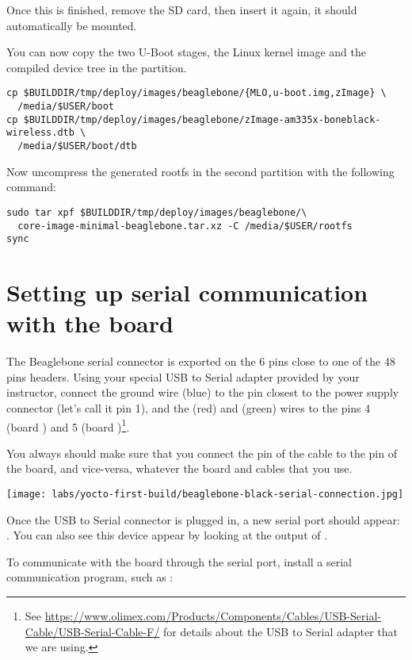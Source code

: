 Once this is finished, remove the SD card, then insert it again, it
should automatically be mounted.

You can now copy the two U-Boot stages, the Linux kernel image and the compiled
device tree in the  partition.
\begin{verbatim}
cp $BUILDDIR/tmp/deploy/images/beaglebone/{MLO,u-boot.img,zImage} \
  /media/$USER/boot
cp $BUILDDIR/tmp/deploy/images/beaglebone/zImage-am335x-boneblack-wireless.dtb \
  /media/$USER/boot/dtb
\end{verbatim}

Now uncompress the generated rootfs in the second partition with the
following  command:
\begin{verbatim}
sudo tar xpf $BUILDDIR/tmp/deploy/images/beaglebone/\
  core-image-minimal-beaglebone.tar.xz -C /media/$USER/rootfs
sync
\end{verbatim}

\section{Setting up serial communication with the board}

The Beaglebone serial connector is exported on the 6 pins close to one
of the 48 pins headers. Using your special USB to Serial adapter provided
by your instructor, connect the ground wire (blue) to the pin closest
to the power supply connector (let's call it pin 1), and the \code{TX} (red)
and \code{RX} (green) wires to the pins 4 (board \code{RX}) and
5 (board \code{TX})\footnote{See
\url{https://www.olimex.com/Products/Components/Cables/USB-Serial-Cable/USB-Serial-Cable-F/}
for details about the USB to Serial adapter that we are using.}.

You always should make sure that you connect the \code{TX} pin of the cable
to the \code{RX} pin of the board, and vice-versa, whatever the board and
cables that you use.

\begin{center}
\texttt{[image: labs/yocto-first-build/beaglebone-black-serial-connection.jpg]}
\end{center}

Once the USB to Serial connector is plugged in, a new serial port
should appear: .  You can also see this device
appear by looking at the output of .

To communicate with the board through the serial port, install a
serial communication program, such as :

